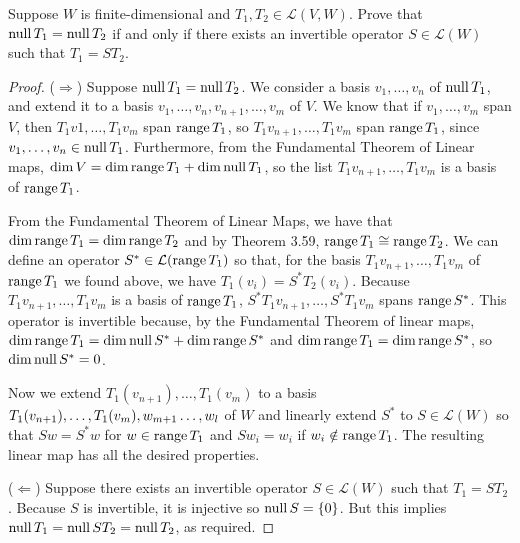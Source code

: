 \begin{exercise}{4}
  Suppose $W$ is finite-dimensional and $T_{1},T_{2}\in\mathcal{L}(V,W)$. Prove that $\operatorname*{null} T_{1}=\operatorname*{null} T_{2}$ if and only if there exists an invertible operator $S\in\mathcal{L}(W)$ such that $T_{1}=ST_{2}$.
\end{exercise}
\begin{proof}
 ($\Rightarrow$) Suppose $\operatorname*{null} T_{1}=\operatorname*{null} T_{2}$. We consider a basis $v_{1},\dots, v_{n}$ of $\operatorname*{null} T_{1}$, and extend it to a basis $v_{1},\dots, v_{n}, v_{n+1},\dots, v_{m}$ of $V$. We know that if $v_{1},\dots,v_{m}$ span $V$, then $T_{1}v{1},\dots, T_{1}v_{m}$ span $\operatorname*{range} T_{1}$, so $T_{1}v_{n+1},\dots, T_{1}v_{m}$ span $\operatorname*{range} T_{1}$, since $v_{1},\dots,v_{n}\in\operatorname*{null} T_{1}$. Furthermore, from the Fundamental Theorem of Linear maps, $\dim V = \dim\operatorname*{range} T_{1} +\dim\operatorname*{null} T_{1}$, so the list $T_{1}v_{n+1},\dots, T_{1}v_{m}$ is a basis of $\operatorname*{range} T_{1}$. 
 
 From the Fundamental Theorem of Linear Maps, we have that $\dim\operatorname*{range} T_{1}=\dim\operatorname*{range} T_{2}$ and by Theorem 3.59, $\operatorname*{range} T_{1}\cong\operatorname*{range} T_{2}$. We  can define an operator $S^{*}\in\mathcal{L}(\operatorname*{range} T_{1})$ so that, for the basis $T_{1}v_{n+1},\dots,T_{1}v_{m}$ of $\operatorname*{range} T_{1}$ we found above, we have $T_{1}(v_{i})=S^{*}T_{2}(v_{i})$. Because $T_{1}v_{n+1},\dots,T_{1}v_{m}$ is a basis of $\operatorname*{range} T_{1}$, $S^{*}T_{1}v_{n+1},\dots,S^{*}T_{1}v_{m}$ spans $\operatorname*{range} S^{*}$. This operator is invertible because, by the Fundamental Theorem of linear maps, $\dim\operatorname*{range} T_{1}= \dim\operatorname*{null} S^{*} + \dim\operatorname*{range} S^{*}$ and $\dim\operatorname*{range} T_{1}= \dim\operatorname*{range} S^{*}$, so $\dim\operatorname*{null} S^{*}=0$.
 
 Now we extend $T_{1}(v_{n+1}),\dots,T_{1}(v_{m})$ to a basis $T_{1}(v_{n+1}),\dots,T_{1}(v_{m}), w_{m+1}\\ \dots,w_{l}$ of $W$ and linearly extend $S^{*}$ to $S\in\mathcal{L}(W)$ so that $Sw=S^{*}w$ for $w\in\operatorname*{range} T_{1}$ and $Sw_{i}=w_{i}$ if $w_{i}\notin \operatorname*{range} T_{1}$. The resulting linear map has all the desired properties.
 
 ($\Leftarrow$) Suppose there exists an invertible operator $S\in\mathcal{L}(W)$ such that $T_{1}=ST_{2}$. Because $S$ is invertible, it is injective so $\operatorname*{null} S=\{0\}$. But this implies $\operatorname*{null} T_{1}=\operatorname*{null} ST_{2}=\operatorname*{null} T_{2}$, as required.
\end{proof}


